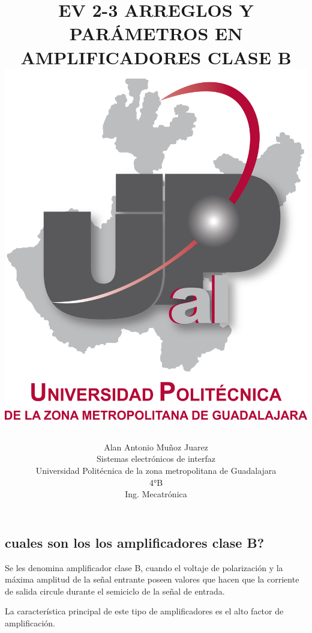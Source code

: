 \documentclass[12pt,a4paper]{article}
\title{EV 2-3 ARREGLOS Y PARÁMETROS EN AMPLIFICADORES CLASE B
\includegraphics [scale=1]{imagenes/UPZMG.png} 
\author{Alan Antonio Muñoz Juarez\\
\small Sistemas electrónicos de interfaz\\
  \small Universidad Politécnica de la zona metropolitana de Guadalajara\\
  \small 4°B \\
  \small Ing. Mecatrónica\\
\centering
\linebreak
}
}
\begin{document}
\maketitle
\newpage
\begin{flushleft}
\section {cuales son los los amplificadores clase B?}
\end{flushleft}
Se les denomina amplificador clase B, cuando el voltaje de polarización y la máxima amplitud de la señal entrante poseen valores que hacen que la corriente de salida circule durante el semiciclo de la señal de entrada.

La característica principal de este tipo de amplificadores es el alto factor de amplificación. 
\end{document}

